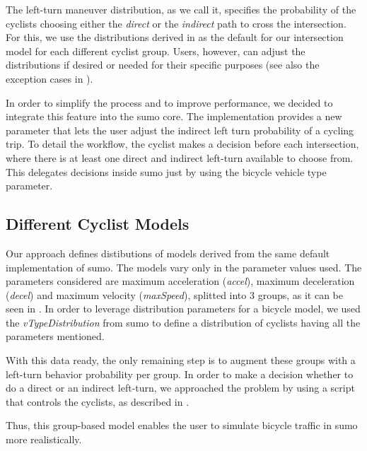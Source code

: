 The left-turn maneuver distribution, as we call it, specifies the probability of the cyclists choosing either the \textit{direct} or the \textit{indirect} path to cross the intersection.
For this, we use the distributions derived in  as the default for our intersection model for each different cyclist group.
Users, however, can adjust the distributions if desired or needed for their specific purposes (see also the exception cases in ).

In order to simplify the process and to improve performance, we decided to integrate this feature into the \ac{sumo} core.
The implementation provides a new parameter that lets the user adjust the indirect left turn probability of a cycling trip.
To detail the workflow, the cyclist makes a decision before each intersection, where there is at least one direct and indirect left-turn available to choose from.
This delegates decisions inside \ac{sumo} just by using the bicycle vehicle type parameter.

\subsection{Different Cyclist Models}
\label{subsec:different_cyclist_models}

Our approach defines distibutions of models derived from the same default implementation of \ac{sumo}.
The models vary only in the parameter values used.
The parameters considered are maximum acceleration (\textit{accel}), maximum deceleration (\textit{decel}) and maximum velocity (\textit{maxSpeed}), splitted into \num{3} groups, as it can be seen in .
In order to leverage distribution parameters for a bicycle model, we used the \textit{vTypeDistribution} from \ac{sumo} to define a distribution of cyclists having all the parameters mentioned.

With this data ready, the only remaining step is to augment these groups with a left-turn behavior probability per group.
In order to make a decision whether to do a direct or an indirect left-turn, we approached the problem by using a script that controls the cyclists, as described in .

Thus, this group-based model enables the user to simulate bicycle traffic in \ac{sumo} more realistically.

